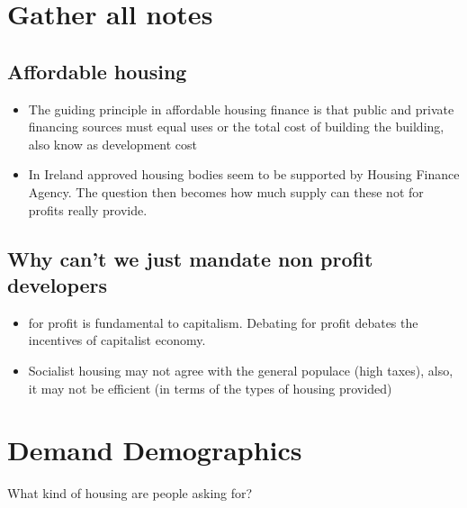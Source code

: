 \documentclass[11pt]{article}
\begin{document}
\hypertarget{gather-all-notes}{%
\section{Gather all notes}\label{gather-all-notes}}

\hypertarget{affordable-housing}{%
\subsection{Affordable housing}\label{affordable-housing}}

\begin{itemize}
\tightlist
\item
  The guiding principle in affordable housing finance is that public and
  private financing sources must equal uses or the total cost of
  building the building, also know as development cost
\item
  In Ireland approved housing bodies seem to be supported by Housing
  Finance Agency. The question then becomes how much supply can these
  not for profits really provide.
\end{itemize}

\hypertarget{why-cant-we-just-mandate-non-profit-developers}{%
\subsection{Why can't we just mandate non profit
developers}\label{why-cant-we-just-mandate-non-profit-developers}}

\begin{itemize}
\tightlist
\item
  for profit is fundamental to capitalism. Debating for profit debates
  the incentives of capitalist economy.
\item
  Socialist housing may not agree with the general populace (high
  taxes), also, it may not be efficient (in terms of the types of
  housing provided)
\end{itemize}

\hypertarget{demand-demographics}{%
\section{Demand Demographics}\label{demand-demographics}}

What kind of housing are people asking for?
\end{document}
